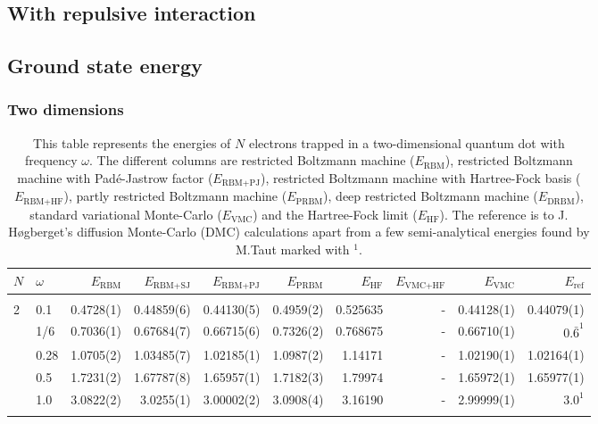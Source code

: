\begin{landscape}
\section{With repulsive interaction}
\subsection{Ground state energy}
\subsubsection{Two dimensions}
\begin{table} [H]
	\caption{This table represents the energies of $N$ electrons trapped in a two-dimensional quantum dot with frequency $\omega$. The different columns are restricted Boltzmann machine ($E_{\text{RBM}}$), restricted Boltzmann machine with Padé-Jastrow factor ($E_{\text{RBM+PJ}}$), restricted Boltzmann machine with Hartree-Fock basis ($E_{\text{RBM+HF}}$), partly restricted Boltzmann machine ($E_{\text{PRBM}}$), deep restricted Boltzmann machine ($E_{\text{DRBM}}$), standard variational Monte-Carlo ($E_{\text{VMC}}$) and the Hartree-Fock limit ($E_{\text{HF}}$). The reference is to J. Høgberget's diffusion Monte-Carlo (DMC) calculations apart from a few semi-analytical energies found by M.Taut marked with $^{1}$. \cite{taut_two_1994}\cite{hogberget_quantum_2013}}
	\begin{tabularx}{\hsize}{l:l|RRRRRRRR} \hline\hline
		\label{tab:quantumdotswinteraction2D1}
		$N$ & $\omega$ & $E_{\text{RBM}}$ & $E_{\text{RBM+SJ}}$ & $E_{\text{RBM+PJ}}$ & $E_{\text{PRBM}}$ & $E_{\text{HF}}$ & $E_{\text{VMC+HF}}$ & $E_{\text{VMC}}$ & $E_{\text{ref}}$ \\ \hline \\
		2 & 0.1 & 0.4728(1) & 0.44859(6) & 0.44130(5) & 0.4959(2) & 0.525635 & - & 0.44128(1) & 0.44079(1) \\ 
		& 1/6 & 0.7036(1) & 0.67684(7) & 0.66715(6) & 0.7326(2) & 0.768675 & - & 0.66710(1) & $0.\bar{6}^{1}$ \\
		& 0.28 & 1.0705(2) & 1.03485(7) & 1.02185(1) & 1.0987(2) & 1.14171 & - & 1.02190(1) & 1.02164(1) \\
		& 0.5 & 1.7231(2) & 1.67787(8) & 1.65957(1) & 1.7182(3) & 1.79974 & - & 1.65972(1) & 1.65977(1)  \\
		& 1.0 & 3.0822(2) & 3.0255(1) & 3.00002(2) & 3.0908(4) & 3.16190 & - & 2.99999(1) & $3.0^{1}$ \\ \hdashline \\


\end{tabularx}
\end{table}
\end{landscape}
